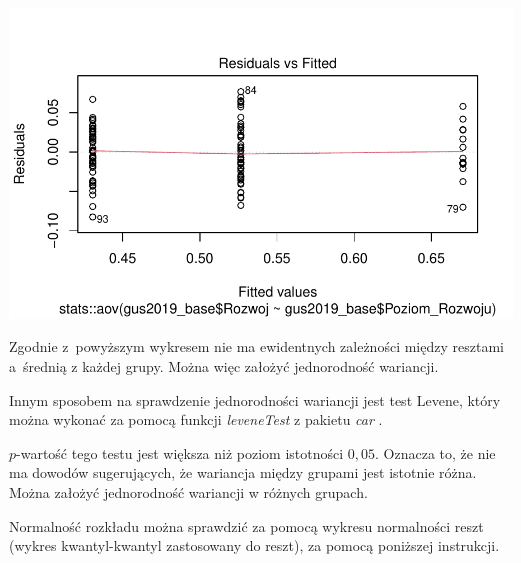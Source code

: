 \documentclass{amuthesis}
\begin{document}
\begin{center}\includegraphics[width=1\linewidth]{figures/unnamed-chunk-37-1} \end{center}

Zgodnie z~powyższym wykresem nie ma ewidentnych zależności między resztami a~średnią z każdej grupy.
Można więc założyć jednorodność wariancji.

Innym sposobem na sprawdzenie jednorodności wariancji jest test Levene, który można wykonać za pomocą funkcji \emph{leveneTest} z pakietu \emph{car} \autocite{R-car}.

\begin{Shaded}
\begin{Highlighting}[]
\SpecialCharTok{::}\SpecialCharTok{$}\SpecialCharTok{\textasciitilde{}}\SpecialCharTok{$}
\end{Highlighting}
\end{Shaded}

\(p\)-wartość tego testu jest większa niż poziom istotności \(0,05\). Oznacza to, że nie ma dowodów sugerujących, że wariancja między grupami jest istotnie różna. Można założyć jednorodność wariancji w różnych grupach.

Normalność rozkładu można sprawdzić za pomocą wykresu normalności reszt (wykres kwantyl-kwantyl zastosowany do reszt), za pomocą poniższej instrukcji.
\end{document}
